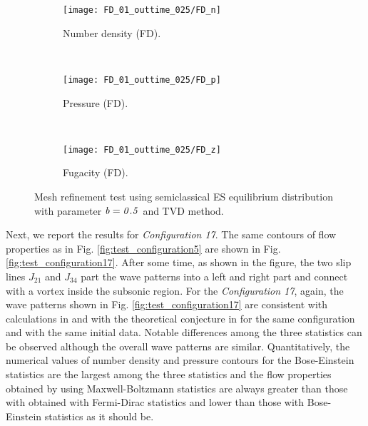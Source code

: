\documentclass{rsproca}%
\begin{document}
\begin{figure}
\centering
	\begin{subfigure}[b]{0.32\textwidth}
                \centering
                \texttt{[image: FD\_01\_outtime\_025/FD\_n]}
                \caption{Number density (FD).}
                \label{fig:5ESBGK_FD_n_400x400}
        \end{subfigure}
        ~ %
        \begin{subfigure}[b]{0.32\textwidth}
                \centering
                \texttt{[image: FD\_01\_outtime\_025/FD\_p]}
                \caption{Pressure (FD).}
                \label{fig:5ESBGK_FD_p_400x400}
        \end{subfigure}
				~ %
        \begin{subfigure}[b]{0.32\textwidth}
                \centering
                \texttt{[image: FD\_01\_outtime\_025/FD\_z]}
                \caption{Fugacity (FD).}
                \label{fig:5ESBGK_FD_z_400x400}
        \end{subfigure}
				\caption{Mesh refinement test using semiclassical ES equilibrium distribution with parameter $\it{b=0.5}$ and TVD method.}
				\label{fig:FD_config5_400x400}
\end{figure}


Next, we report the results for \emph{Configuration 17}. The same contours of flow properties as in Fig. \ref{fig:test_configuration5} are shown in Fig. \ref{fig:test_configuration17}.  After some time, as shown in the figure, the two slip lines $J_{21}$ and $J_{34}$ part the wave patterns into a left and right part and connect with a vortex inside the subsonic region.
For the \emph{Configuration 17}, again, the wave patterns shown in Fig. \ref{fig:test_configuration17} are consistent with calculations in \cite{Laxliu95}\cite{schultzrinne} and  with the theoretical conjecture in \cite{ZhangZheng90} for the same configuration and with the same initial data.   Notable differences among the three statistics can be observed although the overall wave patterns are similar.  Quantitatively, the numerical values of number density and pressure contours for the Bose-Einstein statistics are the largest among the three statistics and the flow properties obtained by using Maxwell-Boltzmann statistics are always greater than those with obtained with Fermi-Dirac statistics and lower than those with Bose-Einstein statistics as it should be.
\end{document}
